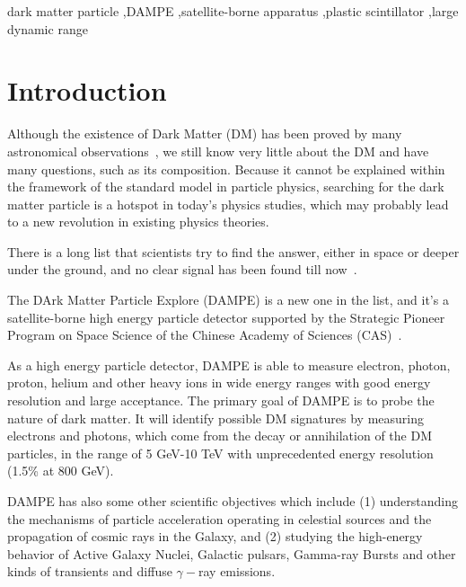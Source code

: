 \documentclass[preprint]{elsarticle}
\begin{document}
\begin{frontmatter}
\begin{abstract}
\end{abstract}

\begin{keyword}

dark matter particle \sep DAMPE \sep satellite-borne apparatus \sep plastic scintillator \sep large dynamic range

\end{keyword}

\end{frontmatter}



\section{Introduction}

Although the existence of Dark Matter (DM) has been proved by many astronomical observations~\cite{Rubin,Clowe}, we still know very little about the DM and have many questions, such as its composition. Because it cannot be explained within the framework of the standard model in particle physics, searching for the dark matter particle is a hotspot in today's physics studies, which may probably lead to a new revolution in existing physics theories.

There is a long list that scientists try to find the answer, either in space or deeper under the ground, and no clear signal has been found till now~\cite{Klasen}.

The DArk Matter Particle Explore (DAMPE) is a new one in the list, and it's a satellite-borne high energy particle detector supported by the Strategic Pioneer Program on Space Science of the Chinese Academy of Sciences (CAS)~\cite{chang}.

As a high energy particle detector, DAMPE is able to measure electron, photon, proton, helium and other heavy ions in wide energy ranges with good energy resolution and large acceptance. The primary goal of DAMPE is to probe the nature of dark matter. It will identify possible DM signatures by measuring electrons and photons, which come from the decay or annihilation of the DM particles, in the range of 5 GeV-10 TeV with unprecedented energy resolution (1.5\% at 800 GeV).

DAMPE has also some other scientific objectives which include (1) understanding the mechanisms of particle acceleration operating in celestial sources and the propagation of cosmic rays in the Galaxy, and (2) studying the high-energy behavior of Active Galaxy Nuclei, Galactic pulsars, Gamma-ray Bursts and other kinds of transients and diffuse $\gamma-$ray emissions.
\end{document}
